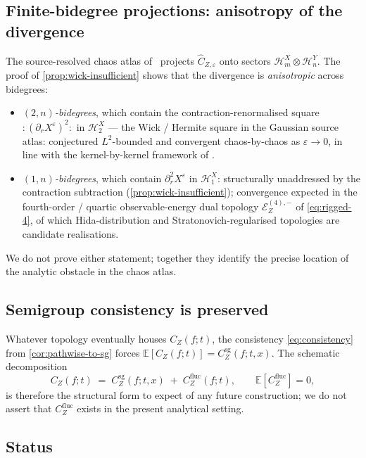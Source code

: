 \documentclass[11pt,reqno]{amsart}
\theoremstyle{plain}
\theoremstyle{definition}
\theoremstyle{remark}
\newcommand{\E}{\mathbb{E}}
\newcommand{\Hilb}{\mathcal{H}}
\newcommand{\Energy}{\mathcal{E}}
\newcommand{\IBM}{Z}
\begin{document}
\subsection*{Finite-bidegree projections: anisotropy of the divergence}

The source-resolved chaos atlas of~\cite{Fontes-IBMchaos} projects
$\widehat C_{\IBM,\varepsilon}$ onto sectors
$\Hilb_m^{X}\otimes\Hilb_n^{Y}$. The proof of
\cref{prop:wick-insufficient} shows that the divergence is
\emph{anisotropic} across bidegrees:
\begin{itemize}
\item \emph{$(2,n)$-bidegrees}, which contain the contraction-renormalised
  square $:(\partial_rX^\varepsilon)^{2}:$ in $\Hilb_2^{X}$ --- the
  Wick / Hermite square in the Gaussian source atlas: conjectured
  $L^{2}$-bounded and convergent chaos-by-chaos as
  $\varepsilon\to 0$, in line with the kernel-by-kernel framework of
  \cite{Fontes-IBMchaos}.
\item \emph{$(1,n)$-bidegrees}, which contain $\partial_r^{2}X^\varepsilon$
  in $\Hilb_1^{X}$: structurally unaddressed by the contraction
  subtraction (\cref{prop:wick-insufficient}); convergence
  expected in the fourth-order / quartic observable-energy dual
  topology $\Energy_\IBM^{(4),-}$ of \eqref{eq:rigged-4}, of which
  Hida-distribution and Stratonovich-regularised topologies are
  candidate realisations.
\end{itemize}
We do not prove either statement; together they identify the precise
location of the analytic obstacle in the chaos atlas.

\subsection*{Semigroup consistency is preserved}

Whatever topology eventually houses $C_\IBM(f;t)$, the consistency
\eqref{eq:consistency} from \cref{cor:pathwise-to-sg} forces
$\E[C_\IBM(f;t)]=C_\IBM^{\mathrm{sg}}(f;t,x)$. The schematic
decomposition
\begin{equation}\label{eq:final-decomp}
  C_\IBM(f;t)\;=\;C_\IBM^{\mathrm{sg}}(f;t,x)
   \;+\;C_\IBM^{\mathrm{fluc}}(f;t),
  \qquad\E[C_\IBM^{\mathrm{fluc}}]=0,
\end{equation}
is therefore the structural form to expect of any future
construction; we do not assert that $C_\IBM^{\mathrm{fluc}}$ exists in
the present analytical setting.

\subsection*{Status}
\end{document}

